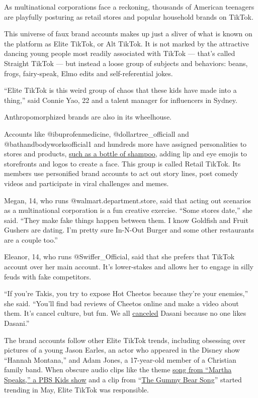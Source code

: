 As multinational corporations face a reckoning, thousands of American
teenagers are playfully posturing as retail stores and popular household
brands on TikTok.

This universe of faux brand accounts makes up just a sliver of what is
known on the platform as Elite TikTok, or Alt TikTok. It is not marked
by the attractive dancing young people most readily associated with
TikTok --- that's called Straight TikTok --- but instead a loose group
of subjects and behaviors: beans, frogs, fairy-speak, Elmo edits and
self-referential jokes.

``Elite TikTok is this weird group of chaos that these kids have made
into a thing,'' said Connie Yao, 22 and a talent manager for influencers
in Sydney.

Anthropomorphized brands are also in its wheelhouse.

Accounts like @ibuprofenmedicine, @dollartree\_officiall and
@bathandbodyworksofficial1 and hundreds more have assigned personalities
to stores and products,
\href{https://www.tiktok.com/@theofficialpantene}{such as a bottle of
shampoo}, adding lip and eye emojis to storefronts and logos to create a
face. This group is called Retail TikTok. Its members use personified
brand accounts to act out story lines, post comedy videos and
participate in viral challenges and memes.

Megan, 14, who runs @walmart.department.store, said that acting out
scenarios as a multinational corporation is a fun creative exercise.
``Some stores date,'' she said. ``They make fake things happen between
them. I know Goldfish and Fruit Gushers are dating. I'm pretty sure
In-N-Out Burger and some other restaurants are a couple too.''

Eleanor, 14, who runs @Swiffer\_Official, said that she prefers that
TikTok account over her main account. It's lower-stakes and allows her
to engage in silly feuds with fake competitors.

``If you're Takis, you try to expose Hot Cheetos because they're your
enemies,'' she said. ``You'll find bad reviews of Cheetos online and
make a video about them. It's cancel culture, but fun. We all
\href{https://www.nytimes3xbfgragh.onion/2018/06/28/style/is-it-canceled.html}{canceled}
Dasani because no one likes Dasani.''

The brand accounts follow other Elite TikTok trends, including obsessing
over pictures of a young Jason Earles, an actor who appeared in the
Disney show ``Hannah Montana,'' and Adam Jones, a 17-year-old member of
a Christian family band. When obscure audio clips like the theme
\href{https://www.youtube.com/watch?v=jSdc55Y3UnU}{song from ``Martha
Speaks,'' a PBS Kids show} and a clip from
``\href{https://www.youtube.com/watch?v=astISOttCQ0}{The Gummy Bear
Song}'' started trending in May, Elite TikTok was responsible.

